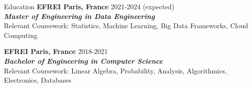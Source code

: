 \documentclass[
	a4paper, %
	10pt, %
]{resume} %
\begin{document}
\begin{rSection}{Education}
	\textbf{EFREI Paris, France} \hfill 2021-2024 (expected) \\
	\textit{\textbf{Master of Engineering in Data Engineering}} \\
	Relevant Coursework: Statistics, Machine Learning, Big Data Frameworks, Cloud Computing

	\textbf{EFREI Paris, France} \hfill 2018-2021 \\
	\textit{\textbf{Bachelor of Engineering in Computer Science}} \\
	Relevant Coursework: Linear Algebra, Probability, Analysis, Algorithmics, Electronics, Databases
\end{rSection}

\end{document}
